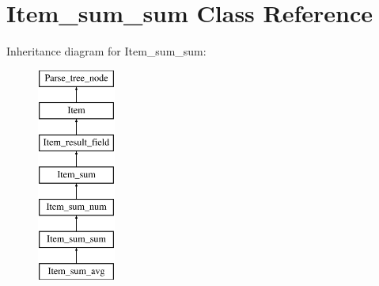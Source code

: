 \hypertarget{classItem__sum__sum}{}\section{Item\+\_\+sum\+\_\+sum Class Reference}
\label{classItem__sum__sum}
Inheritance diagram for Item\+\_\+sum\+\_\+sum\+:\begin{figure}[H]
\begin{center}
\leavevmode
\includegraphics[height=7.000000cm]{classItem__sum__sum}
\end{center}
\end{figure}
